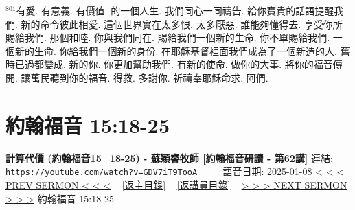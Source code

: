 \documentclass{book}
\begin{document}
$^{801}$有愛.
有意義.
有價值.
的一個人生.
我們同心一同禱告.
給你寶貴的話語提醒我們.
新的命令彼此相愛.
這個世界實在太多恨.
太多厭惡.
誰能夠懂得去.
享受你所賜給我們.
那個和睦.
你與我們同在.
賜給我們一個新的生命.
你不單賜給我們.
一個新的生命.
你給我們一個新的身份.
在耶穌基督裡面我們成為了一個新造的人.
舊時已過都變成.
新的你.
你更加幫助我們.
有新的使命.
做你的大事.
將你的福音傳開.
讓萬民聽到你的福音.
得救.
多謝你.
祈禱奉耶穌命求.
阿們.
\newpage



\section{約翰福音 15:18-25}
\label{sec:GDV7iT9TooA}
\textbf{計算代價 (約翰福音15\_18-25) - 蘇穎睿牧師 [約翰福音研讀 - 第62講]}
\newline
\newline
連結: \href{https://youtube.com/watch?v=GDV7iT9TooA}{\texttt{https://youtube.com/watch?v=GDV7iT9TooA}} ~~~~ 語音日期: 2025-01-08
\newline
\newline
\hyperref[sec:prT7wwZLltI]{< < < PREV SERMON < < <}
~
\hyperlink{toc}{[返主目錄]}
~
\hyperref[ch:preacher11]{[返講員目錄]}
~
\hyperref[sec:pF1FrHKEPww]{> > > NEXT SERMON > > >}
\newline
\newline
約翰福音 15:18-25
\newline
\end{document}
